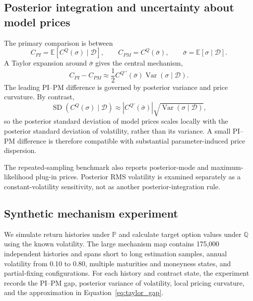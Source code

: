 \subsection{Posterior integration and uncertainty about model prices}

The primary comparison is between
\begin{equation}
 C_{PI}=\mathbb E[C^Q(\sigma)\mid\mathcal D],
 \qquad
 C_{PM}=C^Q(\bar\sigma),
 \qquad
 \bar\sigma=\mathbb E[\sigma\mid\mathcal D].
 \label{eq:estimators}
\end{equation}
A Taylor expansion around \(\bar\sigma\) gives the central mechanism,
\begin{equation}
 C_{PI}-C_{PM}
 \approx
 \frac12 C^{Q\prime\prime}(\bar\sigma)
 \operatorname{Var}(\sigma\mid\mathcal D).
 \label{eq:taylor_gap}
\end{equation}
The leading PI--PM difference is governed by posterior variance and price curvature. By contrast,
\begin{equation}
 \operatorname{SD}\!\left(C^Q(\sigma)\mid\mathcal D\right)
 \approx
 |C^{Q\prime}(\bar\sigma)|
 \sqrt{\operatorname{Var}(\sigma\mid\mathcal D)},
 \label{eq:price_uncertainty_delta}
\end{equation}
so the posterior standard deviation of model prices scales locally with the posterior standard deviation of volatility, rather than its variance. A small PI--PM difference is therefore compatible with substantial parameter-induced price dispersion.

The repeated-sampling benchmark also reports posterior-mode and maximum-likelihood plug-in prices. Posterior RMS volatility is examined separately as a constant-volatility sensitivity, not as another posterior-integration rule.

\subsection{Synthetic mechanism experiment}

We simulate return histories under \(\mathbb P\) and calculate target option values under \(\mathbb Q\) using the known volatility. The large mechanism map contains 175,000 independent histories and spans short to long estimation samples, annual volatility from 0.10 to 0.80, multiple maturities and moneyness states, and partial-fixing configurations. For each history and contract state, the experiment records the PI--PM gap, posterior variance of volatility, local pricing curvature, and the approximation in Equation~\eqref{eq:taylor_gap}.

